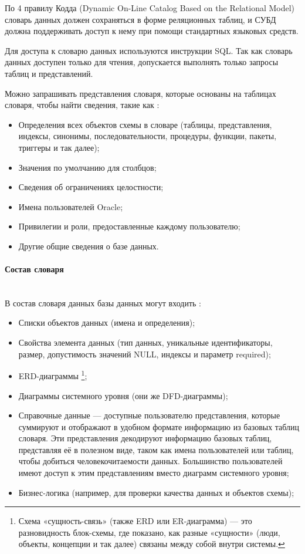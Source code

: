 По 4 правилу Кодда (Dynamic On-Line Catalog Based on the Relational Model) словарь данных должен сохраняться в форме реляционных таблиц, и СУБД должна поддерживать доступ к нему при помощи стандартных языковых средств.


Для доступа к словарю данных используются инструкции SQL. Так как словарь данных доступен только для чтения, допускается выполнять только запросы таблиц и представлений.

Можно запрашивать представления словаря, которые основаны на таблицах словаря, чтобы найти сведения, такие как \autocite{SqlOracle}:
\begin{itemize}
    \item Определения всех объектов схемы в словаре (таблицы, представления, индексы, синонимы, последовательности, процедуры, функции, пакеты, триггеры и так далее);
    \item Значения по умолчанию для столбцов;
    \item Сведения об ограничениях целостности;
    \item Имена пользователей Oracle;
    \item Привилегии и роли, предоставленные каждому пользователю;
    \item Другие общие сведения о базе данных.
\end{itemize}

\paragraph{Состав словаря} ~\\

В состав словаря данных базы данных могут входить \autocite{DataDictionary}:

\begin{itemize}
    \item Списки объектов данных (имена и определения);
    \item Свойства элемента данных (тип данных, уникальные идентификаторы, размер, допустимость значений NULL, индексы и параметр required);
    \item ERD-диаграммы 
        \footnote{Схема «сущность-связь» (также ERD или ER-диаграмма) — это разновидность блок-схемы, где показано, как разные «сущности» (люди, объекты, концепции и так далее) связаны между собой внутри системы.};
    \item Диаграммы системного уровня (они же DFD-диаграммы);
    \item Справочные данные — доступные пользователю представления, которые суммируют и отображают в удобном формате информацию из базовых таблиц словаря. Эти представления декодируют информацию базовых таблиц, представляя её в полезном виде, таком как имена пользователей или таблиц, чтобы добиться человекочитаемости данных. Большинство пользователей имеют доступ к этим представлениям вместо диаграмм системного уровня;
    \item Бизнес-логика (например, для проверки качества данных и объектов схемы);
\end{itemize}


